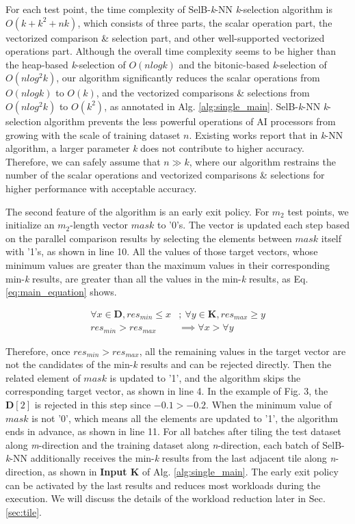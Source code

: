 For each test point, the time complexity of SelB-\textit{k}-NN \textit{k}-selection algorithm is $O(k + k^2 + nk)$, which consists of three parts, the scalar operation part, the vectorized comparison \& selection part, and other well-supported vectorized operations part. Although the overall time complexity seems to be higher than the heap-based \textit{k}-selection of $O(nlogk)$ and the bitonic-based \textit{k}-selection of $O(nlog^2k)$, our algorithm significantly reduces the scalar operations from $O(nlogk)$ to $O(k)$, and the vectorized comparisons \& selections from $O(nlog^2k)$ to $O(k^2)$, as annotated in Alg. \ref{alg:single_main}. SelB-\textit{k}-NN \textit{k}-selection algorithm prevents the less powerful operations of AI processors from growing with the scale of training dataset $n$. Existing works \cite{hassanat2014solving, abu2019effects} report that in \textit{k}-NN algorithm, a larger parameter \textit{k} does not contribute to higher accuracy. Therefore, we can safely assume that $n \gg k$, where our algorithm restrains the number of the scalar operations and vectorized comparisons \& selections for higher performance with acceptable accuracy.

The second feature of the algorithm is an early exit policy. For $m_2$ test points, we initialize an $m_2$-length vector $mask$ to '0's. The vector is updated each step based on the parallel comparison results by selecting the elements between $mask$ itself with '1's, as shown in line 10. All the values of those target vectors, whose minimum values are greater than the maximum values in their corresponding min-\textit{k} results, are greater than all the values in the min-\textit{k} results, as Eq. \ref{eq:main_equation} shows. 

\begin{equation}
    \label{eq:main_equation}
    \begin{aligned}
    \forall x \in \textbf{D}, res_{min} \le x &;\ 
        \forall y \in \textbf{K}, res_{max} \ge y \\
    res_{min} > res_{max} &\implies \forall x > \forall y
    \end{aligned}
\end{equation}

Therefore, once $res_{min} > res_{max}$, all the remaining values in the target vector are not the candidates of the min-\textit{k} results and can be rejected directly. Then the related element of $mask$ is updated to '1', and the algorithm skips the corresponding target vector, as shown in line 4. In the example of Fig. 3, the $\textbf{D}[2]$ is rejected in this step since $-0.1 > -0.2$. When the minimum value of $mask$ is not '0', which means all the elements are updated to '1', the algorithm ends in advance, as shown in line 11. For all batches after tiling the test dataset along \textit{m}-direction and the training dataset along \textit{n}-direction, each batch of SelB-\textit{k}-NN additionally receives the min-\textit{k} results from the last adjacent tile along \textit{n}-direction, as shown in \textbf{Input K} of Alg. \ref{alg:single_main}. The early exit policy can be activated by the last results and reduces most workloads during the execution. We will discuss the details of the workload reduction later in Sec. \ref{sec:tile}.

